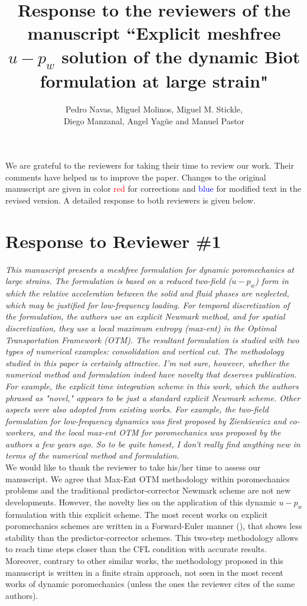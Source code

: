 \documentclass[12pt]{article}
\title{Response to the reviewers of the manuscript ``Explicit meshfree $u-p_w$ solution of the dynamic Biot formulation at large strain"}
\author{Pedro Navas, Miguel Molinos, Miguel M. Stickle, \\ Diego Manzanal, Angel Yag\"ue and Manuel Pastor}
\begin{document}
\maketitle

We  are grateful to the reviewers for taking their time  to review our work. Their comments have helped us to improve the paper. Changes to the original manuscript are given in  color \textcolor{red}{red} for corrections and  \textcolor{blue}{blue} for modified text in the revised version.  A detailed response to both reviewers is given below.

\section*{Response to Reviewer \#1}
{\it
This manuscript presents a meshfree formulation for dynamic poromechanics at large strains. The formulation is based on a reduced two-field ($u-p_w$) form in which the relative acceleration between the solid and fluid phases are neglected, which may be justified for low-frequency loading. For temporal discretization of the formulation, the authors use an explicit Newmark method, and for spatial discretization, they use a local maximum entropy (max-ent) in the Optimal Transportation Framework (OTM). The resultant formulation is studied with two types of numerical examples: consolidation and vertical cut. The methodology studied in this paper is certainly attractive. I'm not sure, however, whether the numerical method and formulation indeed have novelty that deserves publication. For example, the explicit time integration scheme in this work, which the authors phrased as "novel," appears to be just a standard explicit Newmark scheme. Other aspects were also adopted from existing works. For example, the two-field formulation for low-frequency dynamics was first proposed by Zienkiewicz and co-workers, and the local max-ent OTM for poromechanics was proposed by the authors a few years ago. So to be quite honest, I don't really find anything new in terms of the numerical method and formulation.}\\

We would like to thank the reviewer to take his/her time to assess our manuscript. We agree that Max-Ent OTM methodology within poromechanics problems and the traditional predictor-corrector Newmark scheme are not new developments. However, the novelty lies on the application of this dynamic $u-p_w$ formulation with this explicit scheme. The most recent works on explicit poromechanics schemes are written in a Forward-Euler manner (\cite{ZHANG_et_al_2009}), that shows less stability than the predictor-corrector schemes. This two-step methodology allows to reach time steps closer than the CFL condition with accurate results. Moreover, contrary to other similar works, the methodology proposed in this manuscript is written in a finite strain approach, not seen in the most recent works of dynamic poromechanics (unless the ones the reviewer cites of the same authors).\\
\end{document}
